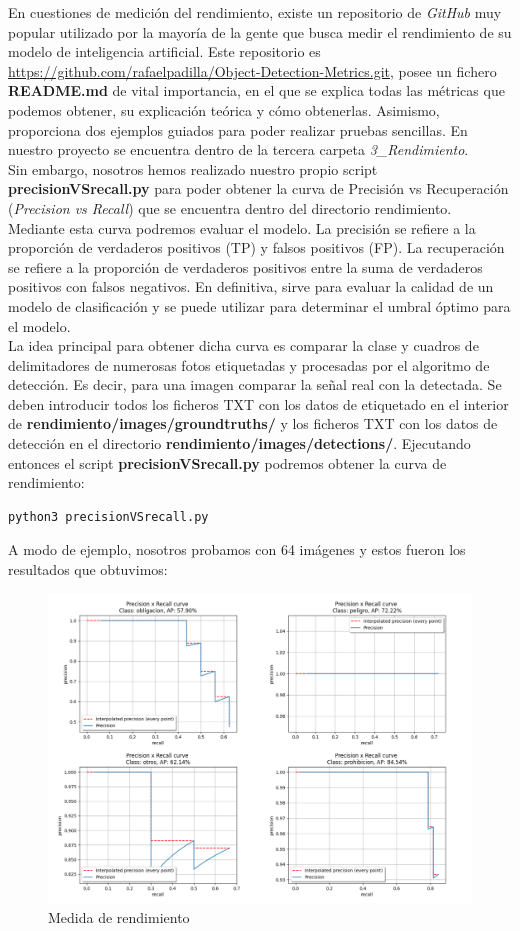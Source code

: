En cuestiones de medición del rendimiento, existe un repositorio de \textit{GitHub} muy popular utilizado por la mayoría de la gente que busca medir el rendimiento de su modelo de inteligencia artificial. Este repositorio es \url{https://github.com/rafaelpadilla/Object-Detection-Metrics.git}, posee un fichero \textbf{README.md} de vital importancia, en el que se explica todas las métricas que podemos obtener, su explicación teórica y cómo obtenerlas. Asimismo, proporciona dos ejemplos guiados para poder realizar pruebas sencillas. En nuestro proyecto se encuentra dentro de la tercera carpeta \textit{3_Rendimiento}.\\

Sin embargo, nosotros hemos realizado nuestro propio script \textbf{precisionVSrecall.py} para poder obtener la curva de Precisión vs Recuperación (\textit{Precision vs Recall}) que se encuentra dentro del directorio rendimiento. Mediante esta curva podremos evaluar el modelo. La precisión se refiere a la proporción de verdaderos positivos (TP) y falsos positivos (FP). La recuperación se refiere a la proporción de verdaderos positivos entre la suma de verdaderos positivos con falsos negativos. En definitiva, sirve para evaluar la calidad de un modelo de clasificación y se puede utilizar para determinar el umbral óptimo para el modelo.\\

La idea principal para obtener dicha curva es comparar la clase y cuadros de delimitadores de numerosas fotos etiquetadas y procesadas por el algoritmo de detección. Es decir, para una imagen comparar la señal real con la detectada. Se deben introducir todos los ficheros TXT con los datos de etiquetado en el interior de \textbf{rendimiento/images/groundtruths/} y los ficheros TXT con los datos de detección en el directorio \textbf{rendimiento/images/detections/}. Ejecutando entonces el script \textbf{precisionVSrecall.py} podremos obtener la curva de rendimiento:
\begin{lstlisting}
python3 precisionVSrecall.py
\end{lstlisting}

A modo de ejemplo, nosotros probamos con 64 imágenes y estos fueron los resultados que obtuvimos:

\begin{figure}[H]
	\centering
	\includegraphics[width=\textwidth]{Imagenes/AnexoI_Manual/AA/rendimiento.pdf}
	\caption{Medida de rendimiento}
	\label{rendimiento2}
\end{figure}



